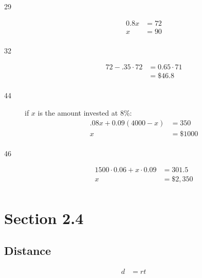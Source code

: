 \documentclass[letterpaper, landscape]{exam}
\begin{document}
  \begin{description}

    \item[29]
      \begin{align*}
        0.8x & = 72 \\
        x    & = \boxed{ 90 } \\
      \end{align*}

    \item[32]
      \begin{align*}
        72 - .35 \cdot 72 & = 0.65 \cdot 71 \\
                          & = \boxed{ \$46.8 } \\
      \end{align*}

    \item[44]
      if $x$ is the amount invested at 8\%:
      \begin{align*}
        .08x + 0.09(4000 - x) & = 350 \\
        x                     & = \boxed{ \$1000 } \\
      \end{align*}

    \item[46]
      \begin{align*}
        1500 \cdot 0.06 + x \cdot 0.09 & = 301.5 \\
        x                              & = \boxed{ \$2,350 } \\
      \end{align*}

  \end{description}

  \section{Section 2.4} %


  \subsection{Distance} %
  
  \begin{align*}
    d &= rt \\
  \end{align*}
\end{document}

